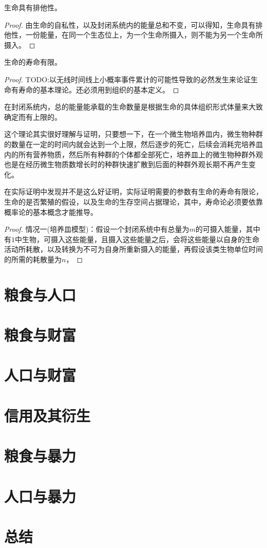 \begin{theorem}
    生命具有排他性。
\end{theorem}
\begin{proof}
    由生命的自私性，以及封闭系统内的能量总和不变，可以得知，生命具有排他性，一份能量，在同一个生态位上，为一个生命所摄入，则不能为另一个生命所摄入。
\end{proof}

\begin{theorem}
    生命的寿命有限。
\end{theorem}
\begin{proof}
    TODO:以无线时间线上小概率事件累计的可能性导致的必然发生来论证生命有寿命的基本理论。还必须用到组织的基本定义。
\end{proof}

\begin{theorem}
    在封闭系统内，总的能量能承载的生命数量是根据生命的具体组织形式体量来大致确定而有上限的。
\end{theorem}

这个理论其实很好理解与证明，只要想一下，在一个微生物培养皿内，微生物种群的数量在一定的时间内就会达到一个上限，然后逐步的死亡，后续会消耗完培养皿内的所有营养物质，然后所有种群的个体都全部死亡，培养皿上的微生物种群外观也是在经历微生物质数增长时的种群快速扩散到后面的种群外观长期不再产生变化。

在实际证明中发现并不是这么好证明，实际证明需要的参数有生命的寿命有限论，生命的是否繁殖的假设，以及生命的生存空间占据理论，其中，寿命论必须要依靠概率论的基本概念才能推导。
\begin{proof}
    情况一(培养皿模型)：假设一个封闭系统中有总量为$m$的可摄入能量，其中有$1$中生物，可摄入这些能量，且摄入这些能量之后，会将这些能量以自身的生命活动所耗散，以及转换为不可为自身所重新摄入的能量，再假设该类生物单位时间的所需的耗散量为$n$，
\end{proof}

\newpage

\section{粮食与人口}
\section{粮食与财富}
\section{人口与财富}
\section{信用及其衍生}
\section{粮食与暴力}
\section{人口与暴力}
\section{总结}

